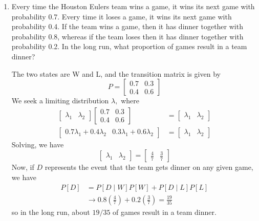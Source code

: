 \documentclass{article}
\begin{document}
\begin{enumerate}
	\item Every time the Houston Eulers team wins a game, it wins its next game with probability 0.7. Every time it loses a game, it wins its next game with probability 0.4. If the team wins a game, then it has dinner together with probability 0.8, whereas if the team loses then it has dinner together with probability 0.2. In the long run, what proportion of games result in a team dinner?
		\begin{soln}
			The two states are W and L, and the transition matrix is given by
			\[P=\begin{bmatrix}
					0.7 & 0.3 \\ 0.4 & 0.6
			\end{bmatrix}\]
			We seek a limiting distribution $\lambda,$ where
			\begin{align*}
				\begin{bmatrix}
					\lambda_1 & \lambda_2
				\end{bmatrix}\begin{bmatrix}
					0.7 & 0.3 \\ 0.4 & 0.6
				\end{bmatrix} &= \begin{bmatrix}
					\lambda_1 & \lambda_2
				\end{bmatrix} \\
				\begin{bmatrix}
					0.7\lambda_1+0.4\lambda_2 & 0.3\lambda_1+0.6\lambda_2
				\end{bmatrix}&=\begin{bmatrix}
					\lambda_1 & \lambda_2
				\end{bmatrix}
			\end{align*}
			Solving, we have
			\[\begin{bmatrix}
					\lambda_1 & \lambda_2
				\end{bmatrix} = \begin{bmatrix}
					\frac{4}{7} & \frac{3}{7}
			\end{bmatrix}\]
			Now, if $D$ represents the event that the team gets dinner on any given game, we have
			\begin{align*}
				P[D] &= P[D\mid W]P[W] + P[D\mid L]P[L] \\
				&\to 0.8\left( \frac{4}{7} \right) + 0.2\left( \frac{3}{7} \right) = \frac{19}{35}
			\end{align*}
			so in the long run, about $19/35$ of games result in a team dinner.
		\end{soln}


\end{enumerate}
\end{document}
